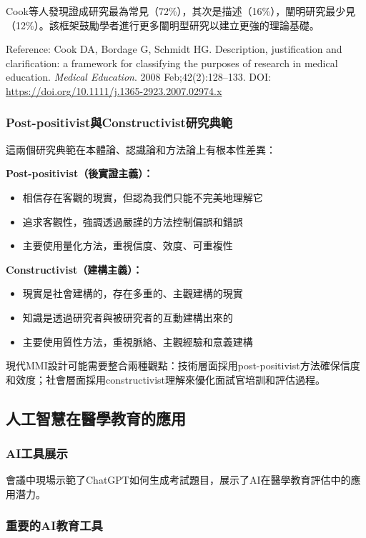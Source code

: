 \documentclass[12pt,a4paper]{article}
\begin{document}
Cook等人發現證成研究最為常見（72\%），其次是描述（16\%），闡明研究最少見（12\%）。該框架鼓勵學者進行更多闡明型研究以建立更強的理論基礎。

Reference: Cook DA, Bordage G, Schmidt HG. 
Description, justification and clarification: a framework for classifying the purposes of research in medical education. 
\textit{Medical Education}. 2008 Feb;42(2):128--133. 
DOI: \url{https://doi.org/10.1111/j.1365-2923.2007.02974.x}

\subsubsection{Post-positivist與Constructivist研究典範}

這兩個研究典範在本體論、認識論和方法論上有根本性差異：

\textbf{Post-positivist（後實證主義）：}
\begin{itemize}[nosep]
    \item 相信存在客觀的現實，但認為我們只能不完美地理解它
    \item 追求客觀性，強調透過嚴謹的方法控制偏誤和錯誤
    \item 主要使用量化方法，重視信度、效度、可重複性
\end{itemize}

\textbf{Constructivist（建構主義）：}
\begin{itemize}[nosep]
    \item 現實是社會建構的，存在多重的、主觀建構的現實
    \item 知識是透過研究者與被研究者的互動建構出來的
    \item 主要使用質性方法，重視脈絡、主觀經驗和意義建構
\end{itemize}

現代MMI設計可能需要整合兩種觀點：技術層面採用post-positivist方法確保信度和效度；社會層面採用constructivist理解來優化面試官培訓和評估過程。

\subsection{人工智慧在醫學教育的應用}

\subsubsection{AI工具展示}

會議中現場示範了ChatGPT如何生成考試題目，展示了AI在醫學教育評估中的應用潛力。

\subsubsection{重要的AI教育工具}
\end{document}
